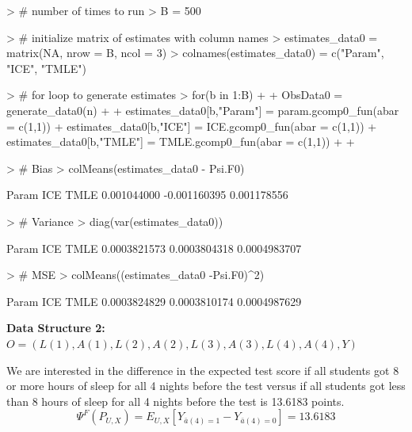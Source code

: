 \documentclass[answers]{exam}
\begin{document}
\begin{solution}
\begin{Schunk}
\begin{Sinput}
> # number of times to run
> B = 500
\end{Sinput}
\end{Schunk}
\begin{Schunk}
\begin{Sinput}
> # initialize matrix of estimates with column names
> estimates_data0 = matrix(NA, nrow = B, ncol = 3)
> colnames(estimates_data0) = c("Param", "ICE", "TMLE")
\end{Sinput}
\end{Schunk}
\begin{Schunk}
\begin{Sinput}
> # for loop to generate estimates
> for(b in 1:B){
+   
+   ObsData0 = generate_data0(n)
+   
+   estimates_data0[b,"Param"] = param.gcomp0_fun(abar = c(1,1))
+   estimates_data0[b,"ICE"] = ICE.gcomp0_fun(abar = c(1,1)) 
+   estimates_data0[b,"TMLE"] = TMLE.gcomp0_fun(abar = c(1,1))
+   
+ }
\end{Sinput}
\end{Schunk}
\begin{Schunk}
\begin{Sinput}
> # Bias
> colMeans(estimates_data0 - Psi.F0)
\end{Sinput}
\begin{Soutput}
       Param          ICE         TMLE 
 0.001044000 -0.001160395  0.001178556 
\end{Soutput}
\begin{Sinput}
> # Variance
> diag(var(estimates_data0))
\end{Sinput}
\begin{Soutput}
       Param          ICE         TMLE 
0.0003821573 0.0003804318 0.0004983707 
\end{Soutput}
\begin{Sinput}
> # MSE
> colMeans((estimates_data0 -Psi.F0)^2)
\end{Sinput}
\begin{Soutput}
       Param          ICE         TMLE 
0.0003824829 0.0003810174 0.0004987629 
\end{Soutput}
\end{Schunk}
\end{solution}

\pagebreak
\noindent\large\textbf{Data Structure 2: $O = (L(1), A(1), L(2), A(2), L(3), A(3), L(4), A(4), Y)$}
\normalsize


We are interested in the difference in the expected test score if all students got 8 or more hours of sleep for all 4 nights before the test versus if all students got less than 8 hours of sleep for all 4 nights before the test is 13.6183 points.
\[
\Psi^F(P_{U,X}) = E_{U,X}[Y_{\bar{a}(4)=1} - Y_{\bar{a}(4)=0}] = 13.6183
\]
\end{document}
